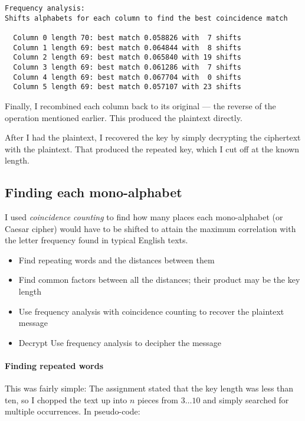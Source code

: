 \documentclass[a4paper,english,12pt]{article}
\begin{document}
\begin{verbatim}
Frequency analysis:
Shifts alphabets for each column to find the best coincidence match

  Column 0 length 70: best match 0.058826 with  7 shifts
  Column 1 length 69: best match 0.064844 with  8 shifts
  Column 2 length 69: best match 0.065840 with 19 shifts
  Column 3 length 69: best match 0.061286 with  7 shifts
  Column 4 length 69: best match 0.067704 with  0 shifts
  Column 5 length 69: best match 0.057107 with 23 shifts
\end{verbatim}

Finally, I recombined each column back to its original --- the reverse of the
operation mentioned earlier. This produced the plaintext directly.

After I had the plaintext, I recovered the key by simply decrypting the
ciphertext with the plaintext. That produced the repeated key, which I cut off
at the known length.

\subsection{Finding each mono-alphabet}

I used \textit{coincidence counting} \cite{coincidence.friedman} to
find how many places each mono-alphabet (or Caesar cipher) would have to be
shifted to attain the maximum correlation with the letter frequency found in
typical English texts.


\begin{itemize}
  \item Find repeating words and the distances between them
  \item Find common factors between all the distances; their product may be the
    key length
  \item Use frequency analysis with coincidence counting to recover the
    plaintext message
  \item Decrypt Use frequency analysis to decipher the message
\end{itemize}

\paragraph{Finding repeated words}

This was fairly simple: The assignment stated that the key length was less than
ten, so I chopped the text up into $n$ pieces from $3\dots10$ and simply
searched for multiple occurrences. In pseudo-code:
\end{document}
